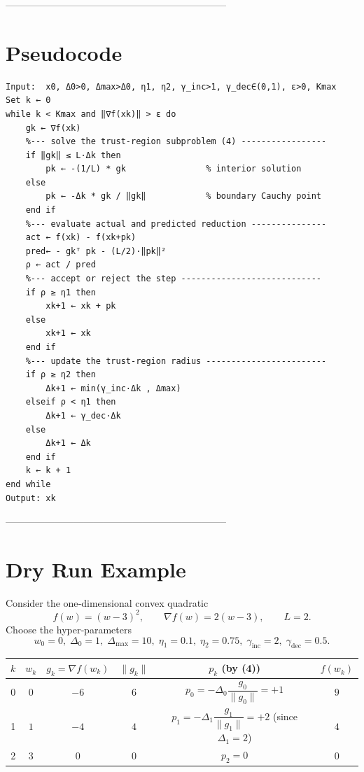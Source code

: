 \documentclass{article}
\begin{document}
--------------------------------------------------------------------

\section*{Pseudocode}
\begin{verbatim}
Input:  x0, Δ0>0, Δmax>Δ0, η1, η2, γ_inc>1, γ_dec∈(0,1), ε>0, Kmax
Set k ← 0
while k < Kmax and ‖∇f(xk)‖ > ε do
    gk ← ∇f(xk)
    %--- solve the trust‑region subproblem (4) -----------------
    if ‖gk‖ ≤ L·Δk then
        pk ← -(1/L) * gk                % interior solution
    else
        pk ← -Δk * gk / ‖gk‖            % boundary Cauchy point
    end if
    %--- evaluate actual and predicted reduction ---------------
    act ← f(xk) - f(xk+pk)
    pred← - gkᵀ pk - (L/2)·‖pk‖²
    ρ ← act / pred
    %--- accept or reject the step ----------------------------
    if ρ ≥ η1 then
        xk+1 ← xk + pk
    else
        xk+1 ← xk
    end if
    %--- update the trust‑region radius ------------------------
    if ρ ≥ η2 then
        Δk+1 ← min(γ_inc·Δk , Δmax)
    elseif ρ < η1 then
        Δk+1 ← γ_dec·Δk
    else
        Δk+1 ← Δk
    end if
    k ← k + 1
end while
Output: xk
\end{verbatim}

--------------------------------------------------------------------

\section*{Dry Run Example}
Consider the one‑dimensional convex quadratic
\[
f(w)=(w-3)^{2},\qquad \nabla f(w)=2(w-3),\qquad L=2.
\]
Choose the hyper‑parameters
\[
w_{0}=0,\;\Delta_{0}=1,\;\Delta_{\max}=10,\;
\eta_{1}=0.1,\;\eta_{2}=0.75,\;
\gamma_{\text{inc}}=2,\;\gamma_{\text{dec}}=0.5 .
\]

\begin{center}
\begin{tabular}{c|c|c|c|c|c}
$k$ & $w_{k}$ & $g_{k}= \nabla f(w_{k})$ & $\|g_{k}\|$ & $p_{k}$ (by (4)) & $f(w_{k})$\\\hline
0 & $0$ & $-6$ & $6$ & $p_{0}= -\Delta_{0}\dfrac{g_{0}}{\|g_{0}\|}=+1$ & $9$\\
1 & $1$ & $-4$ & $4$ & $p_{1}= -\Delta_{1}\dfrac{g_{1}}{\|g_{1}\|}=+2$ (since $\Delta_{1}=2$) & $4$\\
2 & $3$ & $0$  & $0$ & $p_{2}=0$ & $0$\\
\end{tabular}
\end{center}
\end{document}
